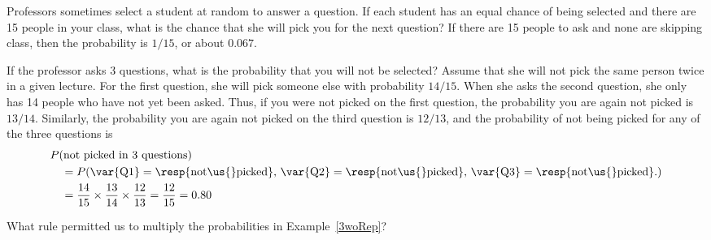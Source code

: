\begin{examplewrap}
\begin{nexample}{Professors sometimes select a student at random to answer a question. If each student has an equal chance of being selected and there are 15 people in your class, what is the chance that she will pick you for the next question?}
If there are 15 people to ask and none are skipping class, then the probability is $1/15$, or about $0.067$.
\end{nexample}
\end{examplewrap}

\begin{examplewrap}
\begin{nexample}{If the professor asks 3 questions, what is the probability that you will not be selected? Assume that she will not pick the same person twice in a given lecture.}\label{3woRep}
For the first question, she will pick someone else with probability $14/15$. When she asks the second question, she only has 14 people who have not yet been asked. Thus, if you were not picked on the first question, the probability you are again not picked is $13/14$. Similarly, the probability you are again not picked on the third question is $12/13$, and the probability of not being picked for any of the three questions is
\begin{align*}
&P(\text{not picked in 3 questions}) \\
&\quad = P(\text{\var{Q1}} = \text{\resp{not\us{}picked}, }\text{\var{Q2}} = \text{\resp{not\us{}picked}, }\text{\var{Q3}} = \text{\resp{not\us{}picked}.}) \\
&\quad = \frac{14}{15}\times\frac{13}{14}\times\frac{12}{13} = \frac{12}{15} = 0.80
\end{align*}
\end{nexample}
\end{examplewrap}

\begin{exercisewrap}
\begin{nexercise}
What rule permitted us to multiply the probabilities in Example~\ref{3woRep}?\footnotemark
\end{nexercise}
\end{exercisewrap}

